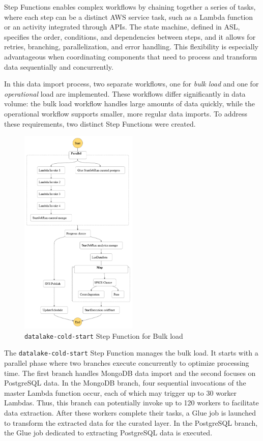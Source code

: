 Step Functions enables complex workflows by chaining together a series of tasks, where each step can be a distinct \ac{AWS} service task, such as a Lambda function or an activity integrated through \ac{API}s. The state machine, defined in \ac{ASL}, specifies the order, conditions, and dependencies between steps, and it allows for retries, branching, parallelization, and error handling. This flexibility is especially advantageous when coordinating components that need to process and transform data sequentially and concurrently.

In this data import process, two separate workflows, one for \textit{bulk load} and one for \textit{operational} load are implemented. These workflows differ significantly in data volume: the bulk load workflow handles large amounts of data quickly, while the operational workflow supports smaller, more regular data imports. To address these requirements, two distinct Step Functions were created.

\begin{figure}[H]
    \centering
    \includegraphics[width=0.5\textwidth]{res/stepfunctions_graph.png}
    \caption{\texttt{datalake-cold-start} Step Function for Bulk load}
    \label{fig:step}
\end{figure}

The \texttt{datalake-cold-start} Step Function manages the bulk load. It starts with a parallel phase where two branches execute concurrently to optimize processing time. The first branch handles MongoDB data import and the second focuses on PostgreSQL data. In the MongoDB branch, four sequential invocations of the master Lambda function occur, each of which may trigger up to 30 worker Lambdas. Thus, this branch can potentially invoke up to 120 workers to facilitate data extraction. After these workers complete their tasks, a Glue job is launched to transform the extracted data for the curated layer. In the PostgreSQL branch, the Glue job dedicated to extracting PostgreSQL data is executed. 

